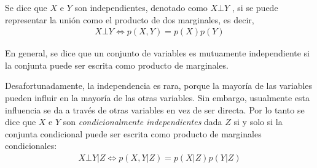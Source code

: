 		Se dice que $X$ e $Y$ son independientes, denotado como $X \bot Y$	, si se puede representar la unión como el producto de dos marginales, es decir,
	\begin{align}
		X \bot Y \Longleftrightarrow p(X,Y) = p(X)p(Y)
	\end{align}			
			
		En general, se dice que un conjunto de variables es mutuamente independiente si la conjunta puede ser escrita como producto de marginales.
		
		Desafortunadamente, la independencia es rara, porque la mayoría de las variables pueden influir en la mayoría de las otras variables. Sin embargo, usualmente esta influencia se da a través de otras variables en vez de ser directa. Por lo tanto se dice que $X$ e $Y$ son \textit{condicionalmente independientes} dada $Z$ si y solo si la conjunta condicional puede ser escrita como producto de marginales condicionales:
		\begin{align}
			X \bot Y|Z \Longleftrightarrow p(X,Y|Z) = p(X|Z)p(Y|Z)
		\end{align}
	
